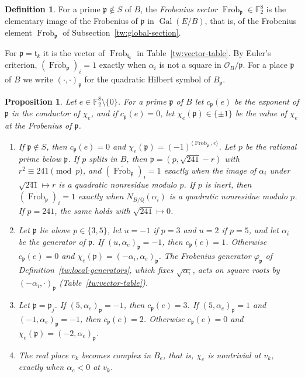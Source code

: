 \documentclass[11pt]{amsart}
\numberwithin{equation}{section}
\newtheorem{proposition}[equation]{Proposition}
\theoremstyle{definition}
\newtheorem{definition}[equation]{Definition}
\theoremstyle{remark}
\DeclareMathOperator{\Gal}{Gal}
\DeclareMathOperator{\Frob}{Frob}
\newcommand{\Ftwo}{\mathbb F_2}
\newcommand{\Q}{\mathbb Q}
\begin{document}
\begin{definition}\label{gf:frobenius-vector}
For a prime $\mathfrak p\notin S$ of $B$, the \emph{Frobenius vector}
$\overline{\Frob}_{\mathfrak p}\in\Ftwo^8$ is the elementary image of the
Frobenius of $\mathfrak p$ in $\Gal(E/B)$, that is, of the Frobenius element
$\Frob_{\mathfrak p}$ of Subsection~\ref{tw:global-section}.
\end{definition}

For $\mathfrak p=\mathfrak t_k$ it is the vector of $\Frob_{\mathfrak t_k}$ in
Table~\ref{tw:vector-table}. By Euler's criterion,
$(\overline{\Frob}_{\mathfrak p})_i=1$ exactly when $\alpha_i$ is not a
square in $\mathcal O_B/\mathfrak p$. For a
place $\mathfrak p$ of $B$ we write $(\cdot,\cdot)_{\mathfrak p}$ for the
quadratic Hilbert symbol of $B_{\mathfrak p}$.

\begin{proposition}\label{gf:local-data}
Let $e\in\Ftwo^8\setminus\{0\}$. For a prime $\mathfrak p$ of $B$ let
$c_{\mathfrak p}(e)$ be the exponent of $\mathfrak p$ in the conductor of
$\chi_e$, and if $c_{\mathfrak p}(e)=0$, let $\chi_e(\mathfrak p)\in\{\pm1\}$
be the value of $\chi_e$ at the Frobenius of $\mathfrak p$.
\begin{enumerate}
\item If $\mathfrak p\notin S$, then $c_{\mathfrak p}(e)=0$ and
 $\chi_e(\mathfrak p)=(-1)^{\langle\overline{\Frob}_{\mathfrak p},e\rangle}$.
 Let $p$ be the rational prime below $\mathfrak p$. If $p$ splits in $B$, then
 $\mathfrak p=(p,\sqrt{241}-r)$ with $r^2\equiv241\pmod p$, and
 $(\overline{\Frob}_{\mathfrak p})_i=1$ exactly when the image of $\alpha_i$
 under $\sqrt{241}\mapsto r$ is a quadratic nonresidue modulo $p$. If $p$ is
 inert, then $(\overline{\Frob}_{\mathfrak p})_i=1$ exactly when
 $N_{B/\Q}(\alpha_i)$ is a quadratic nonresidue modulo $p$. If $p=241$, the
 same holds with $\sqrt{241}\mapsto0$.
\item Let $\mathfrak p$ lie above $p\in\{3,5\}$, let $u=-1$ if $p=3$ and $u=2$
 if $p=5$, and let $\alpha_i$ be the generator of $\mathfrak p$. If
 $(u,\alpha_e)_{\mathfrak p}=-1$, then $c_{\mathfrak p}(e)=1$. Otherwise
 $c_{\mathfrak p}(e)=0$ and
 $\chi_e(\mathfrak p)=(-\alpha_i,\alpha_e)_{\mathfrak p}$. The Frobenius
 generator $\varphi_{\mathfrak p}$ of Definition~\ref{tw:local-generators},
 which fixes $\sqrt{\alpha_i}$, acts on square roots by
 $(-\alpha_i,\cdot)_{\mathfrak p}$ (Table~\ref{tw:vector-table}).
\item Let $\mathfrak p=\mathfrak p_j$. If $(5,\alpha_e)_{\mathfrak p}=-1$, then
 $c_{\mathfrak p}(e)=3$. If $(5,\alpha_e)_{\mathfrak p}=1$ and
 $(-1,\alpha_e)_{\mathfrak p}=-1$, then $c_{\mathfrak p}(e)=2$. Otherwise
 $c_{\mathfrak p}(e)=0$ and $\chi_e(\mathfrak p)=(-2,\alpha_e)_{\mathfrak p}$.
\item The real place $v_k$ becomes complex in $B_e$, that is, $\chi_e$ is
 nontrivial at $v_k$, exactly when $\alpha_e<0$ at $v_k$.
\end{enumerate}
\end{proposition}
\end{document}
